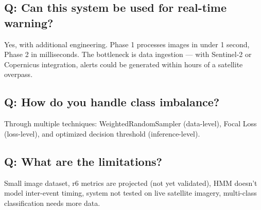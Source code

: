 \documentclass[11pt]{article}
\begin{document}
\subsection{Q: Can this system be used for real-time warning?}
Yes, with additional engineering. Phase 1 processes images in under 1 second, Phase 2 in milliseconds. The bottleneck is data ingestion --- with Sentinel-2 or Copernicus integration, alerts could be generated within hours of a satellite overpass.

\subsection{Q: How do you handle class imbalance?}
Through multiple techniques: WeightedRandomSampler (data-level), Focal Loss (loss-level), and optimized decision threshold (inference-level).

\subsection{Q: What are the limitations?}
Small image dataset, r6 metrics are projected (not yet validated), HMM doesn't model inter-event timing, system not tested on live satellite imagery, multi-class classification needs more data.
\end{document}
